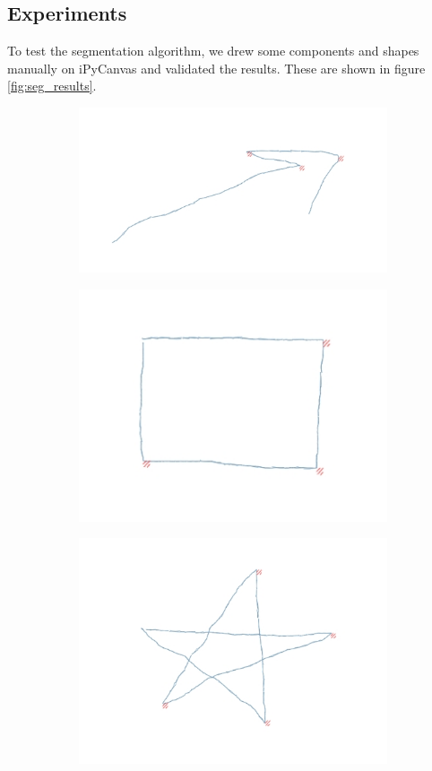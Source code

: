\subsection{Experiments}
To test the segmentation algorithm, we drew some components and shapes manually on iPyCanvas and validated the results. These are shown in figure \ref{fig:seg_results}.
\begin{figure}
	\centering
	\begin{subfigure}{0.8\textwidth}
		\centering
		\includegraphics[scale=0.6]{./img/seg_results_arrow.jpg}
	\end{subfigure}
	\begin{subfigure}{0.8\textwidth}
		\centering
		\includegraphics[scale=0.6]{./img/seg_results_rect.jpg}
	\end{subfigure}
	\begin{subfigure}{0.8\textwidth}
		\centering
		\includegraphics[scale=0.6]{./img/seg_results_pentagram.jpg}

\end{subfigure}
\end{figure}
